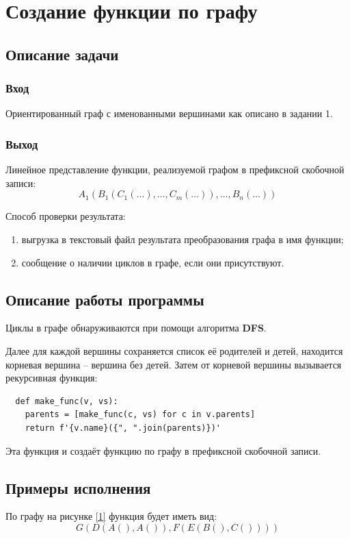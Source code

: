 \documentclass[bachelor, och, pract_otchet]{SCWorks}
\begin{document}
\section{Создание функции по графу}
\subsection{Описание задачи}
\subsubsection{Вход}
Ориентированный граф с именованными вершинами как описано в задании 1.

\subsubsection{Выход}
Линейное представление функции, реализуемой графом в префиксной скобочной записи:
\[ A_1(B_1(C_1(\dots), \dots, C_m(\dots)), \dots, B_n(\dots)) \]

Способ проверки результата:
\begin{enumerate}
  \item выгрузка в текстовый файл результата преобразования графа в имя функции;
  \item сообщение о наличии циклов в графе, если они присутствуют.
\end{enumerate}

\subsection{Описание работы программы}
Циклы в графе обнаруживаются при помощи алгоритма \textbf{DFS}.

Далее для каждой вершины сохраняется список её родителей и детей, находится корневая вершина -- вершина без детей.
Затем от корневой вершины вызывается рекурсивная функция:
\begin{verbatim}
  def make_func(v, vs):
    parents = [make_func(c, vs) for c in v.parents]
    return f'{v.name}({", ".join(parents)})'
\end{verbatim}
Эта функция и создаёт функцию по графу в префиксной скобочной записи.

\subsection{Примеры исполнения}
По графу на рисунке \ref{1} функция будет иметь вид:
\[ G(D(A(), A()), F(E(B(), C()))) \]
\end{document}
